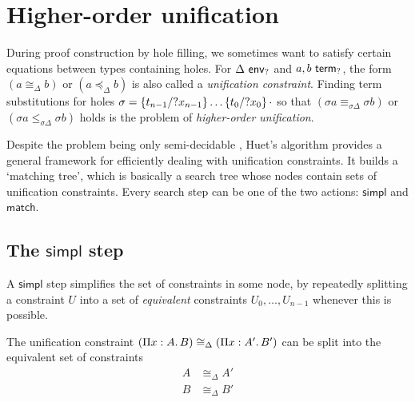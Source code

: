 \documentclass[twoside]{report}
\begin{document}

\section{Higher-order unification}
\label{sec:higher_order_unification}

During proof construction by hole filling, we sometimes want to satisfy certain equations between types containing holes. For $\Delta \envh$ and $a, b \termh$, the form $(a \cong_\Delta b)$ or $(a \preceq_\Delta b)$ is also called a \emph{unification constraint}. Finding term substitutions for holes $\sigma = \subst {?x_{n-1}} {t_{n-1}} {\ldots \subst {?x_0} {t_0} \cdot}$ so that $(\sigma a \equiv_{\sigma \Delta} \sigma b)$ or $(\sigma a \leq_{\sigma \Delta} \sigma b)$ holds is the problem of \emph{higher-order unification}.

Despite the problem being only semi-decidable \cite{huet1973undecidability,goldfarb1981undecidability}, Huet's algorithm \cite{huet1975unification,elliott1990extensions} provides a general framework for efficiently dealing with unification constraints. It builds a `matching tree', which is basically a search tree whose nodes contain sets of unification constraints. Every search step can be one of the two actions: $\mathsf{simpl}$ and $\mathsf{match}$.

\subsection*{The $\mathsf{simpl}$ step}

A $\mathsf{simpl}$ step simplifies the set of constraints in some node, by repeatedly splitting a constraint $U$ into a set of \emph{equivalent} constraints $U_0, \ldots, U_{n-1}$ whenever this is possible.

\begin{example}
    The unification constraint $(\ppi x A B) \cong_\Delta (\ppi x {A'} {B'})$ can be split into the equivalent set of constraints
    $$
        \begin{aligned}
            A & \cong_\Delta A' \\
            B & \cong_\Delta B' \\
        \end{aligned}
    $$
\end{example}
\end{document}
